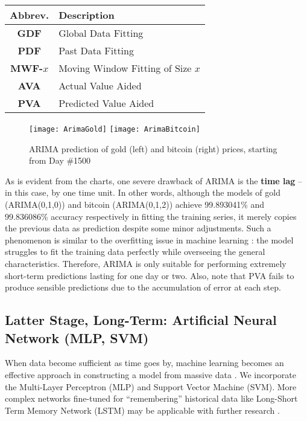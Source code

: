 \documentclass{mcmthesis}
\begin{document}
	\begin{center}
		\begin{tabular}{cl}
			\toprule
			Abbrev. & Description \\ \midrule
			\textbf{GDF} & Global Data Fitting \\
			\textbf{PDF} & Past Data Fitting \\
			\textbf{MWF-$x$} & Moving Window Fitting of Size $x$ \\
			\textbf{AVA} & Actual Value Aided \\
			\textbf{PVA} & Predicted Value Aided \\
			\bottomrule
		\end{tabular}
	\end{center}
	
	\begin{figure}[h]
		\centering \texttt{[image: ArimaGold]}
		\centering \texttt{[image: ArimaBitcoin]}
		\caption{ARIMA prediction of gold (left) and bitcoin (right) prices, starting from Day \#1500}
	\end{figure}
	
	As is evident from the charts, one severe drawback of ARIMA is the \textbf{time lag} -- in this case, by one time unit. In other words, although the models of gold (ARIMA(0,1,0)) and bitcoin (ARIMA(0,1,2)) achieve 99.893041\% and 99.836086\% accuracy respectively in fitting the training series, it merely copies the previous data as prediction despite some minor adjustments. Such a phenomenon is similar to the overfitting issue in machine learning \cite{OVERFIT}: the model struggles to fit the training data perfectly while overseeing the general characteristics. Therefore, ARIMA is only suitable for performing extremely short-term predictions lasting for one day or two. Also, note that PVA fails to produce sensible predictions due to the accumulation of error at each step. 
	
	\subsection{Latter Stage, Long-Term: Artificial Neural Network (MLP, SVM)}
	\label{sec:3.3}
	
	When data become sufficient as time goes by, machine learning becomes an effective approach in constructing a model from massive data \cite{ML}. We incorporate the Multi-Layer Perceptron (MLP) and Support Vector Machine (SVM). More complex networks fine-tuned for ``remembering'' historical data like Long-Short Term Memory Network (LSTM) may be applicable with further research \cite{LSTM}. 
	
\end{document}
